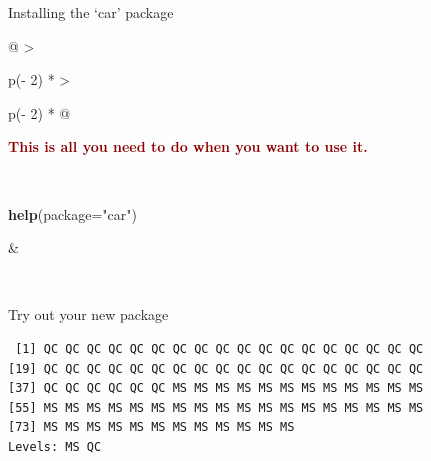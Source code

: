 \documentclass[
  11pt,
  ignorenonframetext,
]{beamer}
\newcommand{\VERB}{\Verb[commandchars=\\\{\}]}
\newenvironment{Shaded}{\begin{snugshade}}{\end{snugshade}}
\newcommand{\AttributeTok}[1]{\textcolor[rgb]{0.13,0.29,0.53}{#1}}
\newcommand{\FunctionTok}[1]{\textcolor[rgb]{0.13,0.29,0.53}{\textbf{#1}}}
\newcommand{\NormalTok}[1]{#1}
\newcommand{\SpecialCharTok}[1]{\textcolor[rgb]{0.81,0.36,0.00}{\textbf{#1}}}
\newcommand{\StringTok}[1]{\textcolor[rgb]{0.31,0.60,0.02}{#1}}
\providecommand{\tightlist}{%
  \setlength{\itemsep}{0pt}\setlength{\parskip}{0pt}}
\newcommand{\important}[1]{\textcolor{darkred}{#1}}
\begin{document}
\begin{frame}{Installing the `car' package}
\begin{longtable}[]{@{}
  >{\raggedright\arraybackslash}p{(\columnwidth - 2\tabcolsep) * }
  >{\raggedright\arraybackslash}p{(\columnwidth - 2\tabcolsep) * }@{}}
\begin{minipage}[t]{\linewidth}
\important{\textbf{This is all you need
to do when you want to use it.}}
\end{minipage} \\
\begin{minipage}[t]{\linewidth}\raggedright
\begin{Shaded}
\begin{Highlighting}[]
\FunctionTok{help}\NormalTok{(}\AttributeTok{package=}\StringTok{"car"}\NormalTok{)}
\end{Highlighting}
\end{Shaded}
\end{minipage} & \begin{minipage}[t]{\linewidth}\raggedright
{}
\end{minipage} \\
\bottomrule\noalign{}
\end{longtable}
\end{frame}

\begin{frame}[fragile]{Try out your new package}
\protect\hypertarget{try-out-your-new-package}{}
\begin{Shaded}
\end{Shaded}

\begin{verbatim}
 [1] QC QC QC QC QC QC QC QC QC QC QC QC QC QC QC QC QC QC
[19] QC QC QC QC QC QC QC QC QC QC QC QC QC QC QC QC QC QC
[37] QC QC QC QC QC QC MS MS MS MS MS MS MS MS MS MS MS MS
[55] MS MS MS MS MS MS MS MS MS MS MS MS MS MS MS MS MS MS
[73] MS MS MS MS MS MS MS MS MS MS MS MS
Levels: MS QC
\end{verbatim}
\end{frame}
\end{document}
